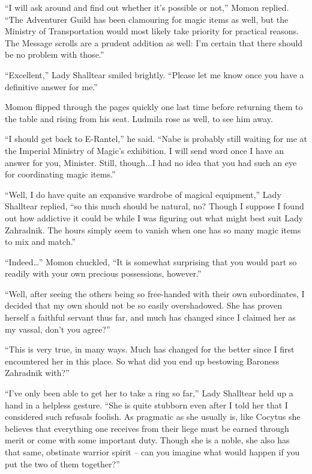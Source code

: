  

“I will ask around and find out whether it’s possible or not,” Momon replied. “The Adventurer Guild has been clamouring for magic items as well, but the Ministry of Transportation would most likely take priority for practical reasons. The Message scrolls are a prudent addition as well: I’m certain that there should be no problem with those.”

 

“Excellent,” Lady Shalltear smiled brightly. “Please let me know once you have a definitive answer for me.”

 

Momon flipped through the pages quickly one last time before returning them to the table and rising from his seat. Ludmila rose as well, to see him away.

 

“I should get back to E-Rantel,” he said. “Nabe is probably still waiting for me at the Imperial Ministry of Magic’s exhibition. I will send word once I have an answer for you, Minister. Still, though...I had no idea that you had such an eye for coordinating magic items.”

 

“Well, I do have quite an expansive wardrobe of magical equipment,” Lady Shalltear replied, “so this much should be natural, no? Though I suppose I found out how addictive it could be while I was figuring out what might best suit Lady Zahradnik. The hours simply seem to vanish when one has so many magic items to mix and match.”

 

“Indeed…” Momon chuckled, “It is somewhat surprising that you would part so readily with your own precious possessions, however.”

 

“Well, after seeing the others being so free-handed with their own subordinates, I decided that my own should not be so easily overshadowed. She has proven herself a faithful servant thus far, and much has changed since I claimed her as my vassal, don’t you agree?”

 

“This is very true, in many ways. Much has changed for the better since I first encountered her in this place. So what did you end up bestowing Baroness Zahradnik with?”

 

“I’ve only been able to get her to take a ring so far,” Lady Shalltear held up a hand in a helpless gesture. “She is quite stubborn even after I told her that I considered such refusals foolish. As pragmatic as she usually is, like Cocytus she believes that everything one receives from their liege must be earned through merit or come with some important duty. Though she is a noble, she also has that same, obstinate warrior spirit – can you imagine what would happen if you put the two of them together?”

